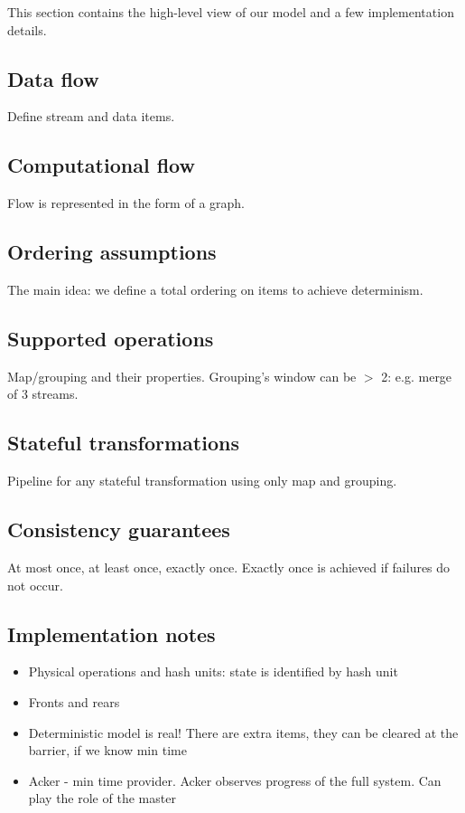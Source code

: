 
\label {fs-model-section}

This section contains the high-level view of our model and a few implementation details.

\subsection{Data flow}
Define stream and data items.

\subsection{Computational flow}
Flow is represented in the form of a graph.

\subsection{Ordering assumptions}
The main idea: we define a total ordering on items to achieve determinism.

\subsection{Supported operations}
Map/grouping and their properties. Grouping's window can be $>$ 2: e.g. merge of 3 streams.

\subsection{Stateful transformations}
Pipeline for any stateful transformation using only map and grouping. 

\subsection{Consistency guarantees}
At most once, at least once, exactly once. Exactly once is achieved if failures do not occur.

\subsection{Implementation notes}

\begin{itemize}
    \item Physical operations and hash units: state is identified by hash unit
    \item Fronts and rears
    \item Deterministic model is real! There are extra items, they can be cleared at the barrier, if we know min time  %
    \item Acker - min time provider. Acker observes progress of the full system. Can play the role of the master %
\end{itemize}
